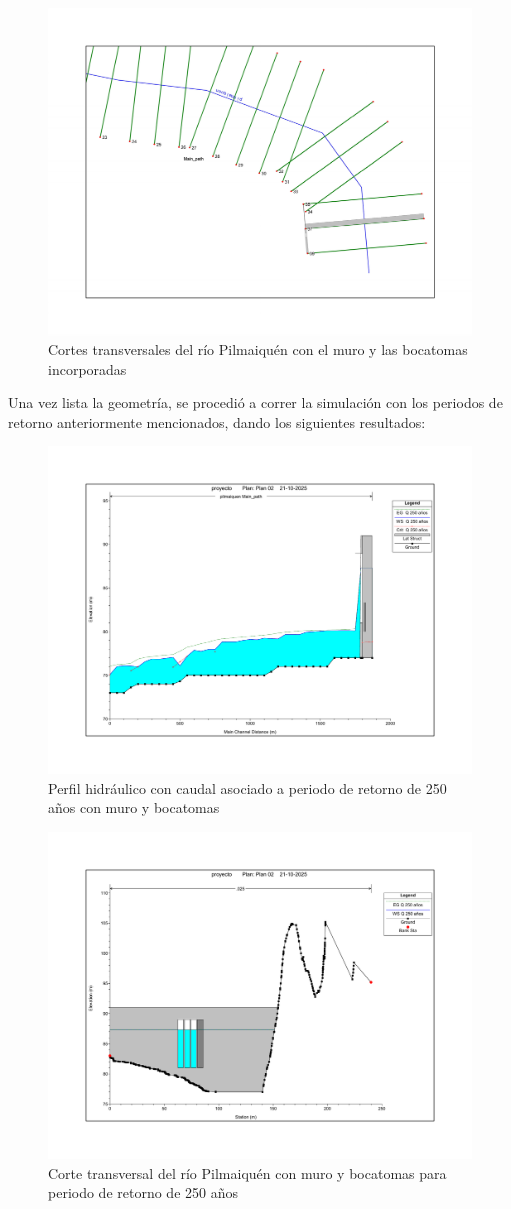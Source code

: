 \documentclass{article} %
\begin{document}
\begin{figure}[H]
    \centering
    \includegraphics[width=0.6\linewidth]{imagenes/rio.pdf}
    \caption{Cortes transversales del río Pilmaiquén con el muro y las bocatomas incorporadas}
\end{figure}

Una vez lista la geometría, se procedió a correr la simulación con los periodos de retorno anteriormente mencionados, dando los siguientes resultados:

\begin{figure}[H]
    \centering
    \includegraphics[width=0.6\linewidth]{imagenes/perfil_250_cb.pdf}
    \caption{Perfil hidráulico con caudal asociado a periodo de retorno de 250 años con muro y bocatomas}
\end{figure}

\begin{figure}[H]
    \centering
    \includegraphics[width=0.6\linewidth]{imagenes/corte_250_cb.pdf}
    \caption{Corte transversal del río Pilmaiquén con muro y bocatomas para periodo de retorno de 250 años}
\end{figure}
\end{document}
